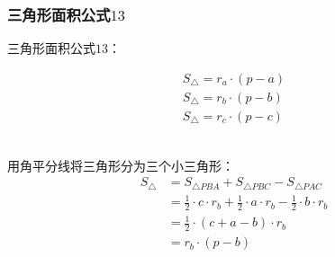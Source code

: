 \documentclass[UTF8]{ctexart}
\begin{document}
\subsubsection{三角形面积公式$13$}
    三角形面积公式$13$：
    \begin{large}
        \begin{align*}
            S_{\triangle}=r_a\cdot(p-a)\\[3mm]
            S_{\triangle}=r_b\cdot(p-b)\\[3mm]
            S_{\triangle}=r_c\cdot(p-c)
        \end{align*}
    \end{large}\\
    用角平分线将三角形分为三个小三角形：
    \setcounter{equation}{0}
    \begin{align}
        S_{\triangle}
        &=S_{\triangle PBA}+S_{\triangle PBC}-S_{\triangle PAC}\\[3mm]
        &=\frac{1}{2}\cdot c\cdot r_b+\frac{1}{2}\cdot a\cdot r_b-\frac{1}{2}\cdot b\cdot r_b\\[3mm]
        &=\frac{1}{2}\cdot(c+a-b)\cdot r_b\\[3mm]
        &=r_b\cdot(p-b)
    \end{align}
\end{document}
